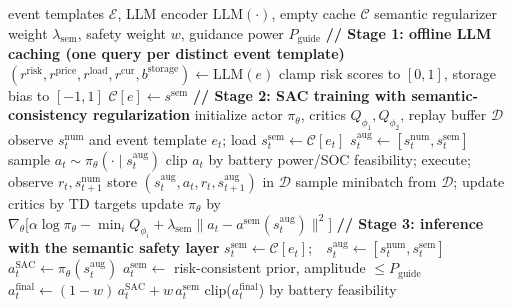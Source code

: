 \documentclass{ieeeaccess}
\begin{document}
\begin{algorithm}[t!]
\caption{LE-DRL-SAC Training and Semantic-Safety-Layer Inference}
\label{alg:ledrl}
\begin{algorithmic}[1]
\Require event templates $\mathcal{E}$, LLM encoder $\mathrm{LLM}(\cdot)$, empty cache $\mathcal{C}$
\Require semantic regularizer weight $\lambda_{\mathrm{sem}}$, safety weight $w$, guidance power $P_{\mathrm{guide}}$
\State \textbf{// Stage 1: offline LLM caching (one query per distinct event template)}
    \State $(r^{\mathrm{risk}}, r^{\mathrm{price}}, r^{\mathrm{load}}, r^{\mathrm{cur}}, b^{\mathrm{storage}}) \gets \mathrm{LLM}(e)$
    \State clamp risk scores to $[0,1]$, storage bias to $[-1,1]$
    \State $\mathcal{C}[e] \gets s^{\mathrm{sem}}$ 
\EndFor
\State \textbf{// Stage 2: SAC training with semantic-consistency regularization}
\State initialize actor $\pi_\theta$, critics $Q_{\phi_1}, Q_{\phi_2}$, replay buffer $\mathcal{D}$
        \State observe $s^{\mathrm{num}}_t$ and event template $e_t$; load $s^{\mathrm{sem}}_t \gets \mathcal{C}[e_t]$
        \State $s^{\mathrm{aug}}_t \gets [s^{\mathrm{num}}_t, s^{\mathrm{sem}}_t]$
        \State sample $a_t \sim \pi_\theta(\cdot \mid s^{\mathrm{aug}}_t)$
        \State clip $a_t$ by battery power/SOC feasibility; execute; observe $r_t, s^{\mathrm{num}}_{t+1}$
        \State store $(s^{\mathrm{aug}}_t, a_t, r_t, s^{\mathrm{aug}}_{t+1})$ in $\mathcal{D}$
        \State sample minibatch from $\mathcal{D}$; update critics by TD targets
        \State update $\pi_\theta$ by $\nabla_\theta \big[ \alpha \log \pi_\theta - \min_i Q_{\phi_i} + \lambda_{\mathrm{sem}}\|a_t - a^{\mathrm{sem}}(s^{\mathrm{aug}}_t)\|^2 \big]$
    \EndFor
\EndFor
\State \textbf{// Stage 3: inference with the semantic safety layer}
    \State $s^{\mathrm{sem}}_t \gets \mathcal{C}[e_t]$;\ \ $s^{\mathrm{aug}}_t \gets [s^{\mathrm{num}}_t, s^{\mathrm{sem}}_t]$
    \State $a^{\mathrm{SAC}}_t \gets \pi_\theta(s^{\mathrm{aug}}_t)$ 
    \State $a^{\mathrm{sem}}_t \gets$ risk-consistent prior, amplitude $\leq P_{\mathrm{guide}}$
    \State $a^{\mathrm{final}}_t \gets (1-w)\,a^{\mathrm{SAC}}_t + w\,a^{\mathrm{sem}}_t$
    \State \Return clip($a^{\mathrm{final}}_t$) by battery feasibility
\EndFunction
\end{algorithmic}
\end{algorithm}
\end{document}
